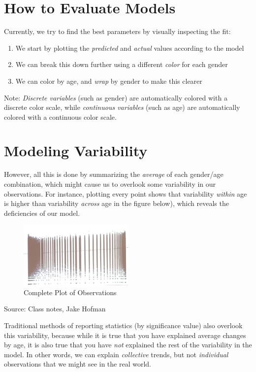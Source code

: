 \setlength{\parskip}{1em}
\setlength{\parindent}{0em}

\section{How to Evaluate Models}

Currently, we try to find the best parameters by visually inspecting the fit:
\begin{enumerate}
\item We start by plotting the \emph{predicted} and \emph{actual} values according to the model
\item We can break this down further using a different \emph{color} for each gender
\item We can color by age, and \emph{wrap} by gender to make this clearer
\end{enumerate}
Note: \emph{Discrete variables} (such as gender) are automatically colored with a discrete color scale, while \emph{continuous variables} (such as age) are automatically colored with a continuous color scale.

\section{Modeling Variability}

However, all this is done by summarizing the \emph{average} of each gender/age combination, which might cause us to overlook some variability in our observations. For instance, plotting every point shows that variability \emph{within} age is higher than variability \emph{across} age in the figure below), which reveals the deficiencies of our model.

\begin{figure}[h]
\begin{center}
\includegraphics[width=0.5\textwidth]{ClassFigure.jpg}
\caption{Complete Plot of Observations}
\end{center}
\end{figure}
\small{Source: Class notes, Jake Hofman}

Traditional methods of reporting statistics (by significance value) also overlook this variability, because while it is true that you have explained average changes by age, it is also true that you have \emph{not} explained the rest of the variability in the model. In other words, we can explain \emph{collective} trends, but not \emph{individual} observations that we might see in the real world.

